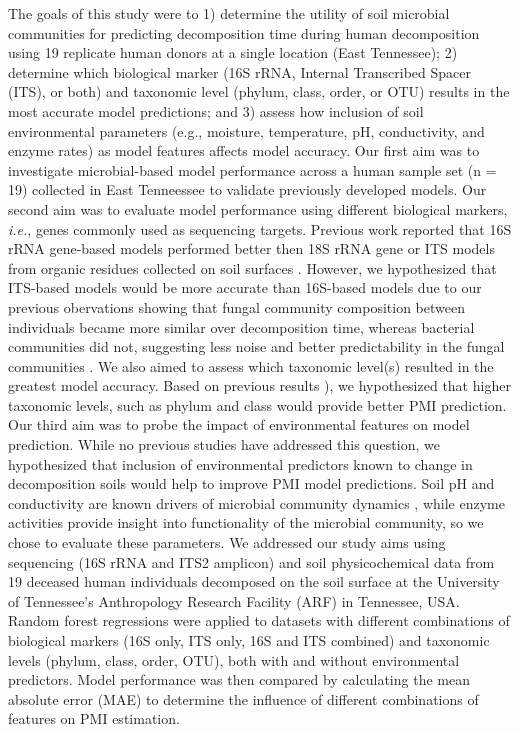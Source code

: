 \documentclass[
  10pt,
  letterpaper,
]{article}
\begin{document}
The goals of this study were to 1) determine the utility of soil
microbial communities for predicting decomposition time during human
decomposition using 19 replicate human donors at a single location (East
Tennessee); 2) determine which biological marker (16S rRNA, Internal
Transcribed Spacer (ITS), or both) and taxonomic level (phylum, class,
order, or OTU) results in the most accurate model predictions; and 3)
assess how inclusion of soil environmental parameters (e.g., moisture,
temperature, pH, conductivity, and enzyme rates) as model features
affects model accuracy. Our first aim was to investigate microbial-based
model performance across a human sample set (n = 19) collected in East
Tenneessee to validate previously developed models. Our second aim was
to evaluate model performance using different biological markers,
\emph{i.e.}, genes commonly used as sequencing targets. Previous work
reported that 16S rRNA gene-based models performed better then 18S rRNA
gene or ITS models from organic residues collected on soil surfaces
\citep{belk_microbiome_2018, burcham_conserved_2024}. However, we
hypothesized that ITS-based models would be more accurate than 16S-based
models due to our previous obervations showing that fungal community
composition between individuals became more similar over decomposition
time, whereas bacterial communities did not, suggesting less noise and
better predictability in the fungal communities \citep{mason_body_2022}.
We also aimed to assess which taxonomic level(s) resulted in the
greatest model accuracy. Based on previous results
\citep{belk_microbiome_2018, mason_body_2022}), we hypothesized that
higher taxonomic levels, such as phylum and class would provide better
PMI prediction. Our third aim was to probe the impact of environmental
features on model prediction. While no previous studies have addressed
this question, we hypothesized that inclusion of environmental
predictors known to change in decomposition soils would help to improve
PMI model predictions. Soil pH and conductivity are known drivers of
microbial community dynamics
\citep{lauber_pyrosequencing-based_2009, rath_linking_2019}, while
enzyme activities provide insight into functionality of the microbial
community, so we chose to evaluate these parameters. We addressed our
study aims using sequencing (16S rRNA and ITS2 amplicon) and soil
physicochemical data from 19 deceased human individuals
\citep{mason_body_2022} decomposed on the soil surface at the University
of Tennessee's Anthropology Research Facility (ARF) in Tennessee, USA.
Random forest regressions were applied to datasets with different
combinations of biological markers (16S only, ITS only, 16S and ITS
combined) and taxonomic levels (phylum, class, order, OTU), both with
and without environmental predictors. Model performance was then
compared by calculating the mean absolute error (MAE) to determine the
influence of different combinations of features on PMI estimation.
\end{document}
